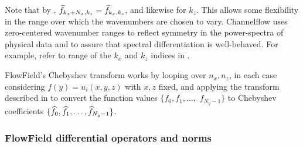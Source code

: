 \documentclass{article}[12pt]
\begin{document}
Note that by , $\widetilde{f}_{k_x+N_x,k_z} = \widetilde{f}_{k_x,k_z}$,
and likewise for $k_z$. This allows some flexibility in the range over
which the wavenumbers are chosen to vary. Channelflow uses zero-centered
wavenumber ranges to reflect symmetry in the power-spectra of physical data
and to assure that spectral differentiation is well-behaved. For example,
refer to range of the $k_x$ and $k_z$ indices in .

FlowField's Chebyshev transform works by looping over $n_x, n_z$,
in each case considering $f(y) = u_i(x,y,z)$ with $x,z$ fixed,
and applying the transform described in  to convert
the function values $\{f_0, f_1, \ldots,$ $f_{N_y-1}\}$ to Chebyshev
coefficients $\{\widehat{f}_0, \widehat{f}_1, \ldots, \widehat{f}_{N_y-1}\}$.

\subsubsection{FlowField differential operators and norms}
\end{document}
